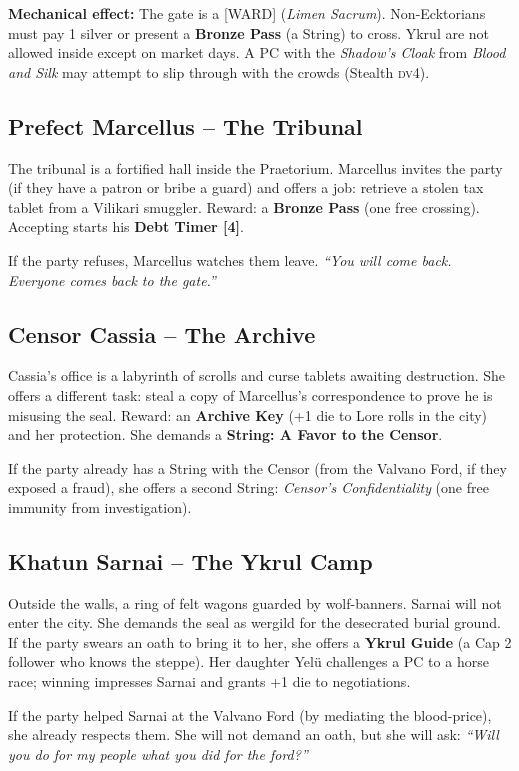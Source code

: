 \documentclass[10pt,twoside]{book}
\newcommand{\tag}[1]{\textsc{[#1]}}
\newcommand{\dv}{\textsc{dv}}
\begin{document}
\textbf{Mechanical effect:} The gate is a \tag{WARD} (\textit{Limen Sacrum}). Non-Ecktorians must pay 1 silver or present a \textbf{Bronze Pass} (a String) to cross. Ykrul are not allowed inside except on market days. A PC with the \textit{Shadow's Cloak} from \textit{Blood and Silk} may attempt to slip through with the crowds (Stealth \dv 4).

\subsection{Prefect Marcellus -- The Tribunal}
The tribunal is a fortified hall inside the Praetorium. Marcellus invites the party (if they have a patron or bribe a guard) and offers a job: retrieve a stolen tax tablet from a Vilikari smuggler. Reward: a \textbf{Bronze Pass} (one free crossing). Accepting starts his \textbf{Debt Timer [4]}.

If the party refuses, Marcellus watches them leave. \textit{``You will come back. Everyone comes back to the gate.''}

\subsection{Censor Cassia -- The Archive}
Cassia's office is a labyrinth of scrolls and curse tablets awaiting destruction. She offers a different task: steal a copy of Marcellus's correspondence to prove he is misusing the seal. Reward: an \textbf{Archive Key} (+1 die to Lore rolls in the city) and her protection. She demands a \textbf{String: A Favor to the Censor}.

If the party already has a String with the Censor (from the Valvano Ford, if they exposed a fraud), she offers a second String: \textit{Censor's Confidentiality} (one free immunity from investigation).

\subsection{Khatun Sarnai -- The Ykrul Camp}
Outside the walls, a ring of felt wagons guarded by wolf-banners. Sarnai will not enter the city. She demands the seal as wergild for the desecrated burial ground. If the party swears an oath to bring it to her, she offers a \textbf{Ykrul Guide} (a Cap 2 follower who knows the steppe). Her daughter Yelü challenges a PC to a horse race; winning impresses Sarnai and grants +1 die to negotiations.

If the party helped Sarnai at the Valvano Ford (by mediating the blood-price), she already respects them. She will not demand an oath, but she will ask: \textit{``Will you do for my people what you did for the ford?''}
\end{document}
